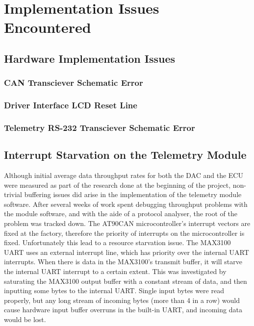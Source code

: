 \section{Implementation Issues Encountered}


\subsection{Hardware Implementation Issues}


\subsubsection{CAN Transciever Schematic Error}


\subsubsection{Driver Interface LCD Reset Line}


\subsubsection{Telemetry RS-232 Transciever Schematic Error}


\subsection{Interrupt Starvation on the Telemetry Module}

Although initial average data throughput rates for both the DAC and the ECU were measured as part of the research done at the beginning of the project, non-trivial buffering issues did arise in the implementation of the telemetry module software. After several weeks of work spent debugging throughput problems with the module software, and with the aide of a protocol analyser, the root of the problem was tracked down. The AT90CAN microcontroller's interrupt vectors are fixed at the factory, therefore the priority of interrupts on the microcontroller is fixed. Unfortunately this lead to a resource starvation issue. The MAX3100 UART uses an external interrupt line, which has priority over the internal UART interrupts. When there is data in the MAX3100's transmit buffer, it will starve the internal UART interrupt to a certain extent. This was investigated by saturating the MAX3100 output buffer with a constant stream of data, and then inputting some bytes to the internal UART. Single input bytes were read properly, but any long stream of incoming bytes (more than 4 in a row) would cause hardware input buffer overruns in the built-in UART, and incoming data would be lost.


